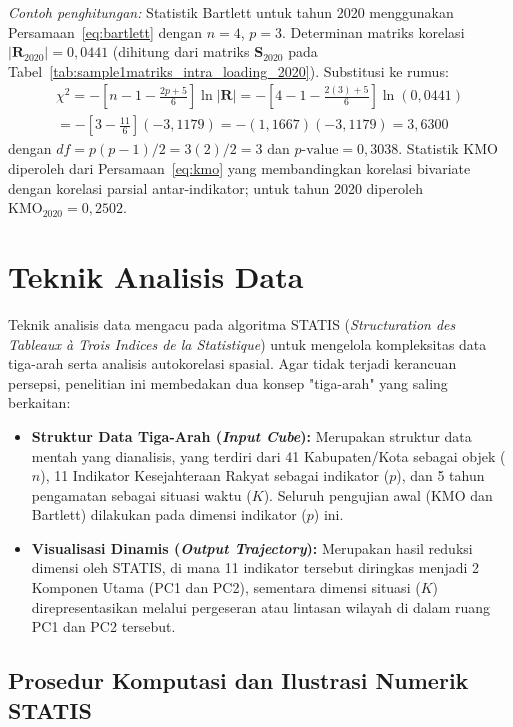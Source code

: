 \medskip
\noindent\textit{Contoh penghitungan:} Statistik Bartlett untuk tahun 2020 menggunakan Persamaan~\ref{eq:bartlett} dengan $n=4$, $p=3$. Determinan matriks korelasi $|\mathbf{R}_{2020}| = 0{,}0441$ (dihitung dari matriks $\mathbf{S}_{2020}$ pada Tabel~\ref{tab:sample1matriks_intra_loading_2020}). Substitusi ke rumus:
\begin{multline*}
  \chi^2 = -\!\left[n-1-\frac{2p+5}{6}\right]\ln|\mathbf{R}| = -\!\left[4-1-\frac{2(3)+5}{6}\right]\ln(0{,}0441) \\
  = -\!\left[3-\frac{11}{6}\right](-3{,}1179) = -(1{,}1667)(-3{,}1179) = 3{,}6300
\end{multline*}
dengan $df = p(p-1)/2 = 3(2)/2 = 3$ dan $p\text{-value} = 0{,}3038$. Statistik KMO diperoleh dari Persamaan~\ref{eq:kmo} yang membandingkan korelasi bivariate dengan korelasi parsial antar-indikator; untuk tahun 2020 diperoleh $\mathrm{KMO}_{2020} = 0{,}2502$.

\section{\normalsize Teknik Analisis Data}
Teknik analisis data mengacu pada algoritma STATIS (\textit{Structuration des Tableaux à Trois Indices de la Statistique}) untuk mengelola kompleksitas data tiga-arah serta analisis autokorelasi spasial. Agar tidak terjadi kerancuan persepsi, penelitian ini membedakan dua konsep "tiga-arah" yang saling berkaitan:
\begin{itemize}
    \item \textbf{Struktur Data Tiga-Arah (\textit{Input Cube}):} Merupakan struktur data mentah yang dianalisis, yang terdiri dari 41 Kabupaten/Kota sebagai objek ($n$), 11 Indikator Kesejahteraan Rakyat sebagai indikator ($p$), dan 5 tahun pengamatan sebagai situasi waktu ($K$). Seluruh pengujian awal (KMO dan Bartlett) dilakukan pada dimensi indikator ($p$) ini.
    \item \textbf{Visualisasi Dinamis (\textit{Output Trajectory}):} Merupakan hasil reduksi dimensi oleh STATIS, di mana 11 indikator tersebut diringkas menjadi 2 Komponen Utama (PC1 dan PC2), sementara dimensi situasi ($K$) direpresentasikan melalui pergeseran atau lintasan wilayah di dalam ruang PC1 dan PC2 tersebut. 
\end{itemize}
\subsection{\normalsize Prosedur Komputasi dan Ilustrasi Numerik STATIS} \label{subsec:ilustrasi_statis}

